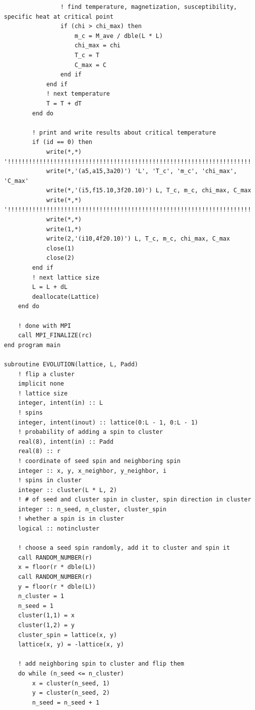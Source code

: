 \documentclass[UTF8,10pt,a4paper]{article}
\theoremstyle{Problem}
\theoremstyle{Solution}
\begin{document}
\begin{lstlisting}
                ! find temperature, magnetization, susceptibility, specific heat at critical point
                if (chi > chi_max) then
                    m_c = M_ave / dble(L * L)
                    chi_max = chi
                    T_c = T
                    C_max = C
                end if
            end if
            ! next temperature
            T = T + dT
        end do

        ! print and write results about critical temperature
        if (id == 0) then
            write(*,*) '!!!!!!!!!!!!!!!!!!!!!!!!!!!!!!!!!!!!!!!!!!!!!!!!!!!!!!!!!!!!!!!!!!!!!!!!!!!!!!!'
            write(*,'(a5,a15,3a20)') 'L', 'T_c', 'm_c', 'chi_max', 'C_max'
            write(*,'(i5,f15.10,3f20.10)') L, T_c, m_c, chi_max, C_max
            write(*,*) '!!!!!!!!!!!!!!!!!!!!!!!!!!!!!!!!!!!!!!!!!!!!!!!!!!!!!!!!!!!!!!!!!!!!!!!!!!!!!!!'
            write(*,*)
            write(1,*)
            write(2,'(i10,4f20.10)') L, T_c, m_c, chi_max, C_max
            close(1)
            close(2)
        end if
        ! next lattice size
        L = L + dL
        deallocate(Lattice)
    end do

    ! done with MPI
    call MPI_FINALIZE(rc)
end program main

subroutine EVOLUTION(lattice, L, Padd)
    ! flip a cluster
    implicit none
    ! lattice size
    integer, intent(in) :: L
    ! spins
    integer, intent(inout) :: lattice(0:L - 1, 0:L - 1)
    ! probability of adding a spin to cluster
    real(8), intent(in) :: Padd
    real(8) :: r
    ! coordinate of seed spin and neighboring spin
    integer :: x, y, x_neighbor, y_neighbor, i
    ! spins in cluster
    integer :: cluster(L * L, 2)
    ! # of seed and cluster spin in cluster, spin direction in cluster
    integer :: n_seed, n_cluster, cluster_spin
    ! whether a spin is in cluster
    logical :: notincluster

    ! choose a seed spin randomly, add it to cluster and spin it
    call RANDOM_NUMBER(r)
    x = floor(r * dble(L))
    call RANDOM_NUMBER(r)
    y = floor(r * dble(L))
    n_cluster = 1
    n_seed = 1
    cluster(1,1) = x
    cluster(1,2) = y
    cluster_spin = lattice(x, y)
    lattice(x, y) = -lattice(x, y)

    ! add neighboring spin to cluster and flip them
    do while (n_seed <= n_cluster)
        x = cluster(n_seed, 1)
        y = cluster(n_seed, 2)
        n_seed = n_seed + 1


\end{lstlisting}
\end{document}
